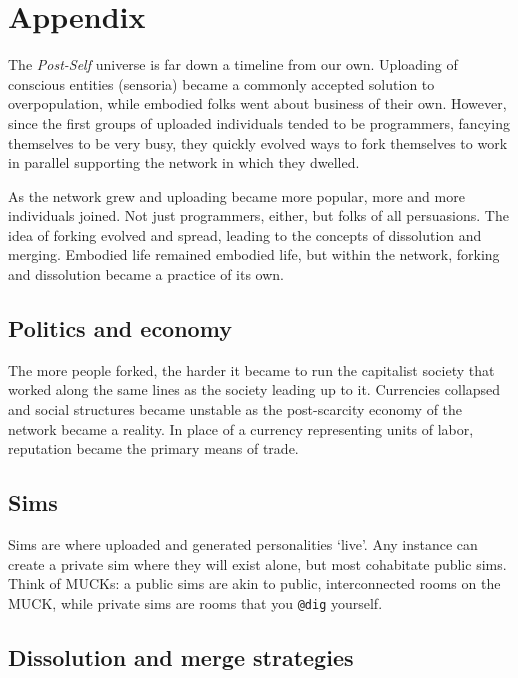 \chapter*{Appendix}

The \emph{Post-Self} universe is far down a timeline from our own. Uploading of conscious entities (sensoria) became a commonly accepted solution to overpopulation, while embodied folks went about business of their own. However, since the first groups of uploaded individuals tended to be programmers, fancying themselves to be very busy, they quickly evolved ways to fork themselves to work in parallel supporting the network in which they dwelled.

As the network grew and uploading became more popular, more and more individuals joined. Not just programmers, either, but folks of all persuasions. The idea of forking evolved and spread, leading to the concepts of dissolution and merging. Embodied life remained embodied life, but within the network, forking and dissolution became a practice of its own.

\hypertarget{politics-and-economy}{%
\section*{Politics and economy}\label{politics-and-economy}}

The more people forked, the harder it became to run the capitalist society that worked along the same lines as the society leading up to it. Currencies collapsed and social structures became unstable as the post-scarcity economy of the network became a reality. In place of a currency representing units of labor, reputation became the primary means of trade.

\hypertarget{sims}{%
\section*{Sims}\label{sims}}

Sims are where uploaded and generated personalities `live'. Any instance can create a private sim where they will exist alone, but most cohabitate public sims. Think of MUCKs: a public sims are akin to public, interconnected rooms on the MUCK, while private sims are rooms that you \texttt{@dig} yourself.

\hypertarget{dissolution-and-merge-strategies}{%
\section*{Dissolution and merge strategies}\label{dissolution-and-merge-strategies}}

